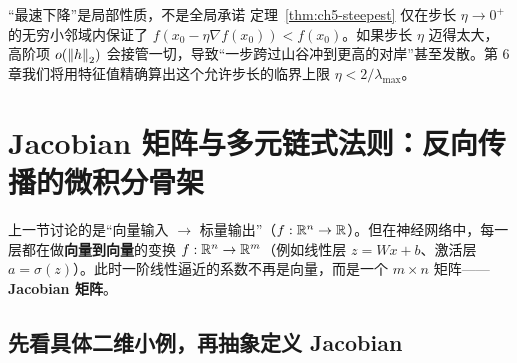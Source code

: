 \begin{insightBox}{“最速下降”是局部性质，不是全局承诺}
定理~\ref{thm:ch5-steepest} 仅在步长 $\eta\to 0^+$ 的无穷小邻域内保证了 $f(x_0 - \eta \nabla f(x_0)) < f(x_0)$。如果步长 $\eta$ 迈得太大，高阶项 $o(\left\|h\right\|_2)$ 会接管一切，导致“一步跨过山谷冲到更高的对岸”甚至发散。第 6 章我们将用特征值精确算出这个允许步长的临界上限 $\eta < 2/\lambda_{\max}$。
\end{insightBox}

\section{Jacobian 矩阵与多元链式法则：反向传播的微积分骨架}
\label{sec:ch5-jacobian}

上一节讨论的是“向量输入 $\to$ 标量输出”（$f:\mathbb{R}^n\to\mathbb{R}$）。但在神经网络中，每一层都在做\textbf{向量到向量}的变换 $f:\mathbb{R}^n\to\mathbb{R}^m$（例如线性层 $z = Wx+b$、激活层 $a = \sigma(z)$）。此时一阶线性逼近的系数不再是向量，而是一个 $m\times n$ 矩阵——\textbf{Jacobian 矩阵}。

\subsection{先看具体二维小例，再抽象定义 Jacobian}

